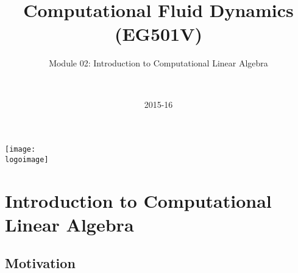 \documentclass[10pt,compress,handout,ignorenonframetext]{beamer}
\institute{School of Engineering}
\title{Computational Fluid Dynamics (EG501V)}
\subtitle{Module 02: Introduction to Computational Linear Algebra}
\date[2015-16]{2015-16}
\author[\shortname]{%
  \fullname\\\ttfamily{\emailaddress}
}
\newcommand{\logoimage}{./FigBanner/UoAHorizBanner}
\begin{document}
\begin{frame}
  \titlepage
  \vfill%
  \begin{center}
    \texttt{[image: \\logoimage]}
  \end{center}
\end{frame}






\section{Introduction to Computational Linear Algebra} 

\subsection{Motivation}
\end{document}
